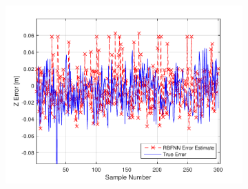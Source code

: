 \begin{figure}
\begin{subfigure}{0.3\textwidth}
    \includegraphics[width=\textwidth]{figures/chapter4/z_valid}
    \caption{}
  \end{subfigure}


\end{figure}
